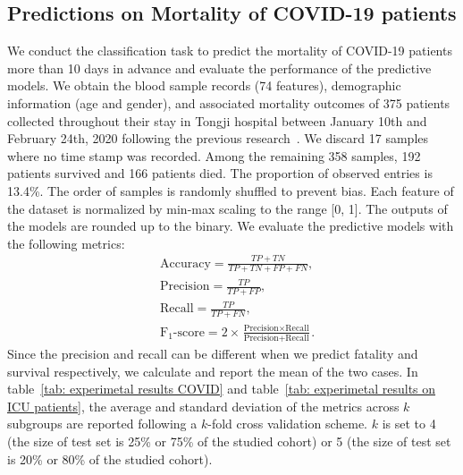 \subsection{Predictions on Mortality of COVID-19 patients}

We conduct the classification task to predict the mortality of COVID-19 patients more than 10 days in advance and evaluate the performance of the predictive models.
We obtain the blood sample records (74 features), demographic information (age and gender), and associated mortality outcomes of 375 patients collected throughout their stay in Tongji hospital between January 10th and February 24th, 2020 following the previous research~\cite{yan2020interpretable}. We discard 17 samples where no time stamp was recorded. Among the remaining 358 samples, 192 patients survived and 166 patients died. The proportion of observed entries is 13.4\%. The order of samples is randomly shuffled to prevent bias. Each feature of the dataset is normalized by min-max scaling to the range [0, 1]. 
The outputs of the models are rounded up to the binary. We evaluate the predictive models with the following metrics:
\begin{equation}
\begin{aligned}
    &\text{Accuracy} = \frac{TP + TN}{TP + TN + FP + FN},\\
    &\text{Precision} = \frac{TP}{TP + FP},\\
    &\text{Recall} = \frac{TP}{TP + FN},\\
    &\text{F}_1\text{-score} = 2 \times \frac{\text{Precision} \times \text{Recall}}{\text{Precision} + \text{Recall}}.
\end{aligned}
\end{equation}
Since the precision and recall can be different when we predict fatality and survival respectively, we calculate and report the mean of the two cases. In table~\ref{tab: experimetal results COVID} and table~\ref{tab: experimetal results on ICU patients}, the average and standard deviation of the metrics across $k$ subgroups are reported following a $k$-fold cross validation scheme. $k$ is set to 4 (the size of test set is 25\% or 75\% of the studied cohort) or 5 (the size of test set is 20\% or 80\% of the studied cohort).
